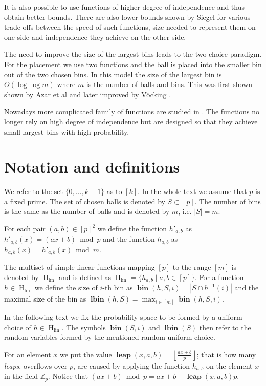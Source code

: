 \documentclass{article}
\newcommand{\hlin}{\operatorname{H}_{\operatorname{lin}}}
\newcommand{\leap}[3]{\operatorname{\mathbf{leap}}({#1}, {#2}, {#3})}
\newcommand{\bin}[3]{\operatorname{\mathbf{bin}}({#1}, {#2}, {#3})}
\newcommand{\lbin}[2]{\operatorname{\mathbf{lbin}}({#1}, {#2})}
\newcommand{\vbin}[2]{\operatorname{\mathbf{bin}}({#1}, {#2})}
\newcommand{\vlbin}[1]{\operatorname{\mathbf{lbin}}({#1})}
\begin{document}
It is also possible to use functions of higher degree of independence and thus obtain better bounds. There are also lower bounds shown by Siegel \cite{siegel} for various trade-offs between the speed of such functions, size needed to represent them on one side and independence they achieve on the other side.

The need to improve the size of the largest bins leads to the two-choice paradigm. For the placement we use two functions and the ball is placed into the smaller bin out of the two chosen bins. In this model the size of the largest bin is $O(\log \log m)$ where $m$ is the number of balls and bins. This was first shown shown by Azar et al \cite{azar} and later improved by V\"{o}cking \cite{vocking}.

Nowadays more complicated family of functions are studied in \cite{celisetal}. The functions no longer rely on high degree of independence but are designed so that they achieve small largest bins with high probability.

\section{Notation and definitions}
\label{sec:notation}
We refer to the set $\{0, \dots, k - 1\}$ as to $[k]$. 
In the whole text we assume that $p$ is a fixed prime. 
The set of chosen balls is denoted by $S \subset [p]$.
The number of bins is the same as the number of balls and is denoted by $m$, i.e. $|S| = m$.

For each pair $(a, b) \in [p]^2$ we define the function $h'_{a, b}$ as $h'_{a, b}(x) = (ax + b) \bmod p$ and the function $h_{a, b}$ as $h_{a, b}(x) = h'_{a, b}(x) \bmod m$.

The multiset of simple linear functions mapping $[p]$ to the range $[m]$ is denoted by $\hlin$ and is defined as $\hlin = \{h_{a, b} \mid a, b \in [p] \}$.
For a function $h \in \hlin$ we define the size of $i$-th bin as $\bin{h}{S}{i} = |S \cap h^{-1}(i)|$ and the maximal size of the bin as $\lbin{h}{S} = \max_{i \in [m]} \bin{h}{S}{i}$.

In the following text we fix the probability space to be formed by a uniform choice of $h \in \hlin$.
The symbols $\vbin{S}{i}$ and $\vlbin{S}$ then refer to the random variables formed by the mentioned random uniform choice.

For an element $x$ we put the value $\leap{x}{a}{b} = \left\lfloor\frac{ax + b}{p}\right\rfloor$; that is how many \emph{leaps}, overflows over $p$, are caused by applying the function $h_{a, b}$ on the element $x$ in the field $\mathbb{Z}_p$. Notice that $(ax + b) \bmod  p = ax + b - \leap{x}{a}{b}p$.
\end{document}
